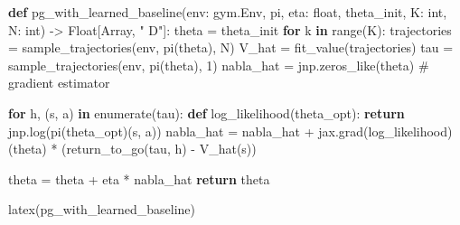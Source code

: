 \documentclass[
  letterpaper,
  DIV=11,
  numbers=noendperiod]{scrreprt}
\newenvironment{Shaded}{\begin{snugshade}}{\end{snugshade}}
\newcommand{\BuiltInTok}[1]{\textcolor[rgb]{0.00,0.23,0.31}{#1}}
\newcommand{\CommentTok}[1]{\textcolor[rgb]{0.37,0.37,0.37}{#1}}
\newcommand{\ControlFlowTok}[1]{\textcolor[rgb]{0.00,0.23,0.31}{\textbf{#1}}}
\newcommand{\DecValTok}[1]{\textcolor[rgb]{0.68,0.00,0.00}{#1}}
\newcommand{\KeywordTok}[1]{\textcolor[rgb]{0.00,0.23,0.31}{\textbf{#1}}}
\newcommand{\NormalTok}[1]{\textcolor[rgb]{0.00,0.23,0.31}{#1}}
\newcommand{\OperatorTok}[1]{\textcolor[rgb]{0.37,0.37,0.37}{#1}}
\newcommand{\StringTok}[1]{\textcolor[rgb]{0.13,0.47,0.30}{#1}}
\theoremstyle{plain}
\theoremstyle{plain}
\theoremstyle{definition}
\theoremstyle{definition}
\theoremstyle{remark}
\begin{document}
\begin{Shaded}
\begin{Highlighting}[]
\KeywordTok{def}\NormalTok{ pg\_with\_learned\_baseline(env: gym.Env, pi, eta: }\BuiltInTok{float}\NormalTok{, theta\_init, K: }\BuiltInTok{int}\NormalTok{, N: }\BuiltInTok{int}\NormalTok{) }\OperatorTok{{-}\textgreater{}}\NormalTok{ Float[Array, }\StringTok{" D"}\NormalTok{]:}
\NormalTok{    theta }\OperatorTok{=}\NormalTok{ theta\_init}
    \ControlFlowTok{for}\NormalTok{ k }\KeywordTok{in} \BuiltInTok{range}\NormalTok{(K):}
\NormalTok{        trajectories }\OperatorTok{=}\NormalTok{ sample\_trajectories(env, pi(theta), N)}
\NormalTok{        V\_hat }\OperatorTok{=}\NormalTok{ fit\_value(trajectories)}
\NormalTok{        tau }\OperatorTok{=}\NormalTok{ sample\_trajectories(env, pi(theta), }\DecValTok{1}\NormalTok{)}
\NormalTok{        nabla\_hat }\OperatorTok{=}\NormalTok{ jnp.zeros\_like(theta)  }\CommentTok{\# gradient estimator}

        \ControlFlowTok{for}\NormalTok{ h, (s, a) }\KeywordTok{in} \BuiltInTok{enumerate}\NormalTok{(tau):}
            \KeywordTok{def}\NormalTok{ log\_likelihood(theta\_opt):}
                \ControlFlowTok{return}\NormalTok{ jnp.log(pi(theta\_opt)(s, a))}
\NormalTok{            nabla\_hat }\OperatorTok{=}\NormalTok{ nabla\_hat }\OperatorTok{+}\NormalTok{ jax.grad(log\_likelihood)(theta) }\OperatorTok{*}\NormalTok{ (return\_to\_go(tau, h) }\OperatorTok{{-}}\NormalTok{ V\_hat(s))}
        
\NormalTok{        theta }\OperatorTok{=}\NormalTok{ theta }\OperatorTok{+}\NormalTok{ eta }\OperatorTok{*}\NormalTok{ nabla\_hat}
    \ControlFlowTok{return}\NormalTok{ theta}

\NormalTok{latex(pg\_with\_learned\_baseline)}
\end{Highlighting}
\end{Shaded}
\end{document}
